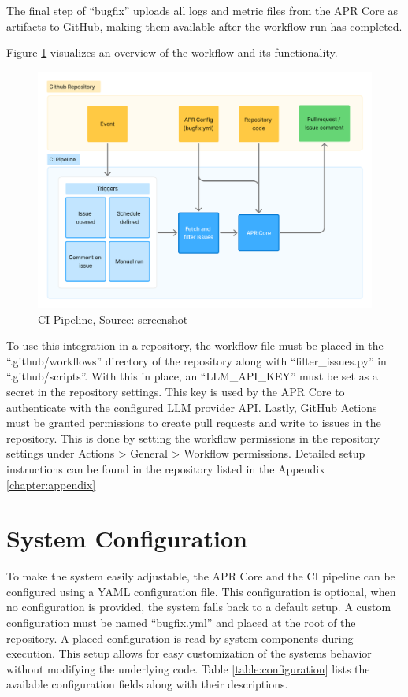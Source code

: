 The final step of ``bugfix'' uploads all logs and metric files from the APR Core as artifacts to GitHub, making them available after the workflow run has completed.

Figure \ref{fig:ci} visualizes an overview of the workflow and its functionality.

\begin{figure}[H]
    \centering
    \includegraphics[width=1\textwidth]{images/flowcharts/ci.png}
    \caption{CI Pipeline, Source: screenshot}
    \label{fig:ci}
\end{figure}

To use this integration in a repository, the workflow file must be placed in the ``.github/workflows'' directory of the repository along with ``filter\_issues.py'' in ``.github/scripts''. With this in place, an ``LLM\_API\_KEY'' must be set as a secret in the repository settings. This key is used by the APR Core to authenticate with the configured \ac{LLM} provider API. Lastly, GitHub Actions must be granted permissions to create pull requests and write to issues in the repository. This is done by setting the workflow permissions in the repository settings under Actions > General > Workflow permissions. Detailed setup instructions can be found in the repository listed in the Appendix \ref{chapter:appendix}

\section{System Configuration}
To make the system easily adjustable, the APR Core and the \ac{CI} pipeline can be configured using a YAML configuration file. This configuration is optional, when no configuration is provided, the system falls back to a default setup. A custom configuration must be named ``bugfix.yml'' and placed at the root of the repository. A placed configuration is read by system components during execution. This setup allows for easy customization of the systems behavior without modifying the underlying code. Table \ref{table:configuration} lists the available configuration fields along with their descriptions.

